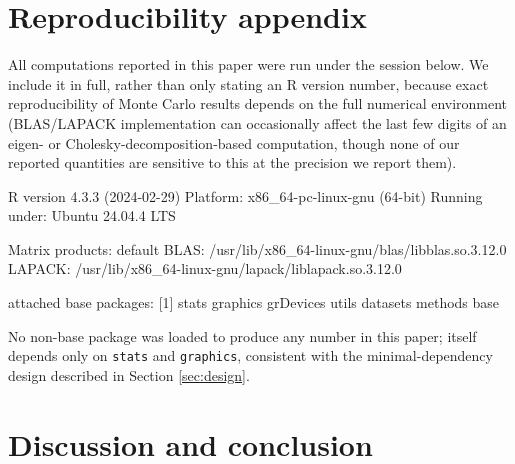 \section{Reproducibility appendix}
\label{sec:reproducibility-appendix}

All computations reported in this paper were run under the session
below. We include it in full, rather than only stating an R version
number, because exact reproducibility of Monte Carlo results depends on
the full numerical environment (BLAS/LAPACK implementation can
occasionally affect the last few digits of an eigen- or
Cholesky-decomposition-based computation, though none of our reported
quantities are sensitive to this at the precision we report them).

\begin{example}
R version 4.3.3 (2024-02-29)
Platform: x86_64-pc-linux-gnu (64-bit)
Running under: Ubuntu 24.04.4 LTS

Matrix products: default
BLAS:   /usr/lib/x86_64-linux-gnu/blas/libblas.so.3.12.0
LAPACK: /usr/lib/x86_64-linux-gnu/lapack/liblapack.so.3.12.0

attached base packages:
[1] stats     graphics  grDevices utils     datasets  methods   base
\end{example}

No non-base package was loaded to produce any number in this paper;
 itself depends only on \texttt{stats} and
\texttt{graphics}, consistent with the minimal-dependency design
described in Section \ref{sec:design}.

\section{Discussion and conclusion}
\label{sec:discussion}

